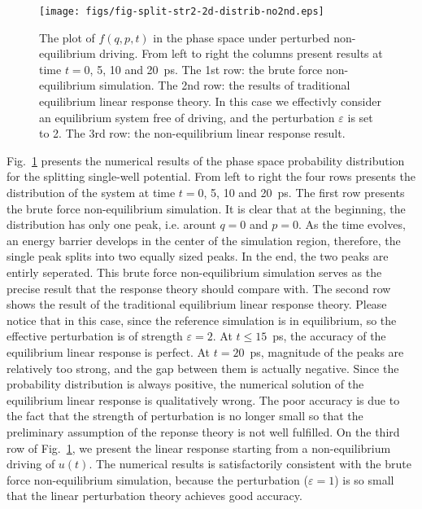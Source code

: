 \documentclass[aip,jcp,a4paper,reprint,onecolumn]{revtex4-1}
\newcommand{\eps}{\varepsilon}
\begin{document}
\begin{figure}
  \centering
  \texttt{[image: figs/fig-split-str2-2d-distrib-no2nd.eps]}
  \caption{ The plot of $ f(q,p,t)$ in the phase
    space under perturbed non-equilibrium driving. From left to right the columns present results at time $t =
    0$, 5, 10 and 20~\textsf{ps}.  The 1st row: the brute force
    non-equilibrium simulation. The 2nd row: the results of
    traditional equilibrium linear response theory. In this case we
    effectivly consider an equilibrium system free of driving, and the perturbation $\eps$ is set to 2.  The 3rd row: the
    non-equilibrium linear response result.  }
  \label{fig:tmp6}
\end{figure}

Fig.~\ref{fig:tmp6} presents the numerical results of the phase space probability distribution for the splitting
single-well potential. From left to right the four rows presents the
distribution of the system at time $t = 0$, 5, 10 and 20~\textsf{ps}. The first
row presents the brute force non-equilibrium simulation.  It is clear
that at the beginning, the distribution has only one peak,
i.e. arount $q = 0$ and $p = 0$. As the time evolves, an energy barrier develops
in the center of the simulation region, therefore, the single peak
splits into two equally sized peaks.  In the end, the two
peaks are entirly seperated.  This brute force non-equilibrium
simulation serves as the precise result that the response theory
should compare with. The second row shows the result of the
traditional equilibrium linear response theory.  Please notice that in
this case, since the reference simulation is in equilibrium, so 
the effective perturbation is of strength $\eps = 2$.  At $t \leq
15$~\textsf{ps}, the accuracy of the equilibrium linear response is
perfect. At $t =
20$~\textsf{ps}, magnitude of the peaks are relatively too strong,
and the gap between them is actually negative.
Since the probability distribution is always positive, the
numerical solution of the equilibrium linear response is qualitatively wrong.
The poor accuracy is due to the fact that the strength of perturbation is no
longer small so that the preliminary assumption of the reponse theory
is not well fulfilled.  On the third row of Fig.~\ref{fig:tmp6},
we present the linear response starting from a non-equilibrium driving
of $u(t)$.  The numerical results is satisfactorily consistent with
the brute force non-equilibrium simulation, because the perturbation
($\eps = 1$) is so small that the linear perturbation theory achieves
good accuracy.
\end{document}

